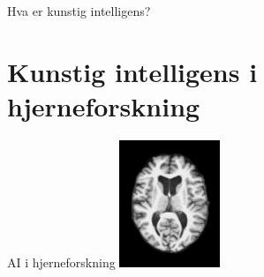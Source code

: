 \documentclass[8pt]{beamer}
\begin{document}
\begin{frame}{Hva er kunstig intelligens?}
		\vfill
	\end{frame}

    \section{Kunstig intelligens i hjerneforskning}

	\begin{frame}{AI i hjerneforskning}
		\centering
		\includegraphics[width=3cm]{data/samples/control_0.png}
	\end{frame}
\end{document}
